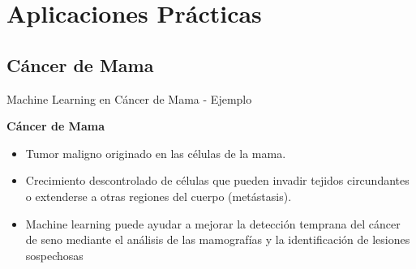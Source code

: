 \documentclass{beamer}
\begin{document}
\section{Aplicaciones Prácticas}
\subsection{Cáncer de Mama}
\begin{frame}{Machine Learning en Cáncer de Mama - Ejemplo}

    \textbf{Cáncer de Mama}
    
    \begin{itemize}
        \item<1-> {
        Tumor maligno originado en las células de la mama.
        }
        \item<2-> {
        Crecimiento descontrolado de células que pueden invadir tejidos circundantes o extenderse a otras regiones del cuerpo (metástasis).
        }
        \item<3-> {
         Machine learning puede ayudar a mejorar la detección temprana del cáncer de seno mediante el análisis de las mamografías y la identificación de lesiones sospechosas 
        }
        
        
        
    \end{itemize}
    
    

\end{frame}
\end{document}
